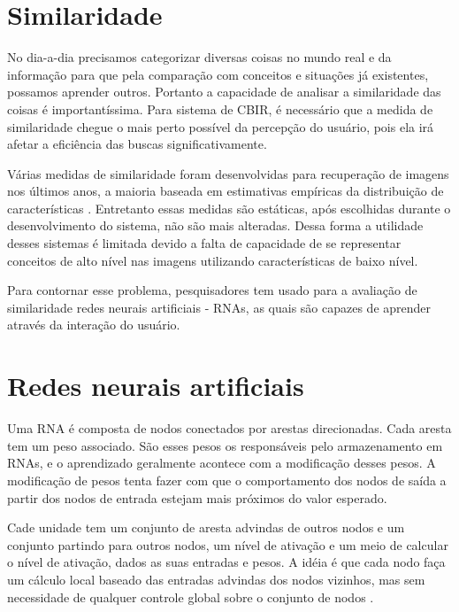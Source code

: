 \section{Similaridade}

No dia-a-dia precisamos categorizar diversas coisas no mundo real e da informação para que pela comparação com conceitos e situações já existentes, possamos aprender outros. Portanto a capacidade de analisar a similaridade das coisas é importantíssima. Para sistema de CBIR, é necessário que a medida de similaridade chegue o mais perto possível da percepção do usuário, pois ela irá afetar a eficiência das buscas significativamente.

Várias medidas de similaridade foram desenvolvidas para recuperação de imagens nos últimos anos, a maioria baseada em estimativas empíricas da distribuição de características \cite{feng-chapter}. Entretanto essas medidas são estáticas, após escolhidas durante o desenvolvimento do sistema, não são mais alteradas. Dessa forma a utilidade desses sistemas é limitada devido a falta de capacidade de se representar conceitos de alto nível nas imagens utilizando características de baixo nível.

Para contornar esse problema, pesquisadores \cite{mammography} \cite{cbir-nn-general} tem usado para a avaliação de similaridade redes neurais artificiais - RNAs, as quais são capazes de aprender através da interação do usuário.

\section{Redes neurais artificiais}

Uma RNA é composta de nodos conectados por arestas direcionadas. Cada aresta tem um peso associado. São esses pesos os responsáveis pelo armazenamento em RNAs, e o aprendizado geralmente acontece com a modificação desses pesos. A modificação de pesos tenta fazer com que o comportamento dos nodos de saída a partir dos nodos de entrada estejam mais próximos do valor esperado.

Cade unidade tem um conjunto de aresta advindas de outros nodos e um conjunto partindo para outros nodos, um nível de ativação e um meio de calcular o nível de ativação, dados as suas entradas e pesos. A idéia é que cada nodo faça um cálculo local baseado das entradas advindas dos nodos vizinhos, mas sem necessidade de qualquer controle global sobre o conjunto de nodos \cite{russel:modern}.


